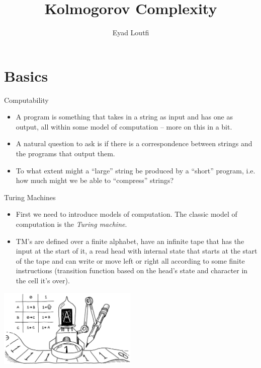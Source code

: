 \documentclass[aspectratio=169]{beamer}
\title{Kolmogorov Complexity}
\author{Eyad Loutfi}
\date{}
\begin{document}

\begin{frame}
\titlepage
\end{frame}

\section{Basics}
\frame{\sectionpage}

\begin{frame}{Computability}
  
  \begin{itemize}
    \item A program is something that takes in a string as input and has one as output, all within some model of computation -- more on this in a bit. \pause
    \item A natural question to ask is if there is a correspondence between strings and the programs that output them. \pause
    \item To what extent might a ``large'' string be produced by a ``short'' program, i.e. how much might we be able to ``compress'' strings?
  \end{itemize}
\end{frame}

\begin{frame}{Turing Machines}
  
  \begin{itemize}
    \item First we need to introduce models of computation. The classic model of computation is the \emph{Turing machine}. \pause
    \item TM's are defined over a finite alphabet, have an infinite tape that has the input at the start of it, a read head with internal state that starts at the start of the tape and can write or move left or right all according to some finite instructions (transition function based on the head's state and character in the cell it's over). 
  \end{itemize}
  \begin{center}
    \includegraphics[width=0.5\textwidth, height=0.5\textheight, keepaspectratio]{Turing_pic.png}
  \end{center}
\end{frame}
\end{document}
